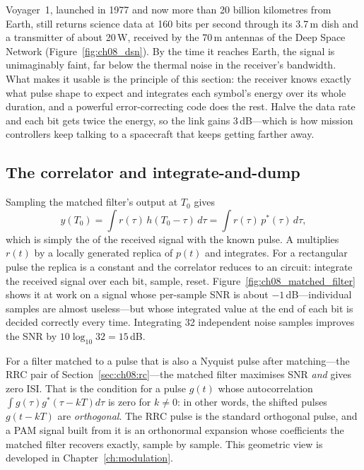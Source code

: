\begin{inpractice}
Voyager~1, launched in 1977 and now more than 20 billion kilometres from Earth, still returns
science data at 160 bits per second through its 3.7\,m dish and a transmitter of about 20\,W,
received by the 70\,m antennas of the Deep Space Network
(Figure~\ref{fig:ch08_dsn}). By the time it reaches Earth, the signal is unimaginably faint,
far below the thermal noise in the receiver's bandwidth. What makes it usable is the
principle of this section: the receiver knows exactly what pulse shape to expect and
integrates each symbol's energy over its whole duration, and a powerful error-correcting
code does the rest. Halve the data rate and each bit gets twice the energy, so the link
gains 3\,dB---which is how mission controllers keep talking to a spacecraft that keeps getting
farther away.
\end{inpractice}

\subsection{The correlator and integrate-and-dump}

Sampling the matched filter's output at $T_0$ gives
\begin{equation}
y(T_0)=\int r(\tau)\,h(T_0-\tau)\,d\tau=\int r(\tau)\,p^*(\tau)\,d\tau,
\end{equation}
which is simply the  of the received signal with the known pulse. A
 multiplies $r(t)$ by a locally generated replica of $p(t)$ and
integrates. For a rectangular pulse the replica is a constant and the correlator reduces to
an  circuit: integrate the received signal over each bit, sample,
reset. Figure~\ref{fig:ch08_matched_filter} shows it at work on a signal whose per-sample SNR is
about $-1$\,dB---individual samples are almost useless---but whose integrated value at the end of
each bit is decided correctly every time. Integrating 32 independent noise samples improves the
SNR by $10\log_{10}32=15$\,dB.


For a filter matched to a pulse that is also a Nyquist pulse after matching---the RRC pair of
Section~\ref{sec:ch08:rc}---the matched filter maximises SNR \emph{and} gives zero ISI. That is
the condition for a pulse $g(t)$ whose autocorrelation $\int g(\tau)g^*(\tau-kT)d\tau$ is zero
for $k\ne0$: in other words, the shifted pulses $g(t-kT)$ are \emph{orthogonal}. The RRC pulse
is the standard orthogonal pulse, and a PAM signal built from it is an orthonormal expansion
whose coefficients the matched filter recovers exactly, sample by sample. This geometric view
is developed in Chapter~\ref{ch:modulation}.

